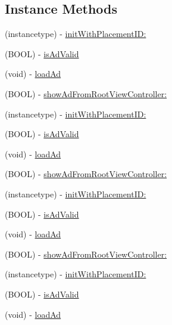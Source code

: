 \subsection*{Instance Methods}
\begin{DoxyCompactItemize}
\item 
(instancetype) -\/ \hyperlink{interfaceFBInterstitialAd_afb4f482b5ab19d486c77785c7794111d}{init\+With\+Placement\+I\+D\+:}
\item 
(B\+O\+OL) -\/ \hyperlink{interfaceFBInterstitialAd_aff851ea8a260430a5b09bce633826876}{is\+Ad\+Valid}
\item 
(void) -\/ \hyperlink{interfaceFBInterstitialAd_a4bbd516a1c5f381ab7af76c2e113fd86}{load\+Ad}
\item 
(B\+O\+OL) -\/ \hyperlink{interfaceFBInterstitialAd_ac9c071a5f699e990e1fa65060fe5c1ce}{show\+Ad\+From\+Root\+View\+Controller\+:}
\item 
(instancetype) -\/ \hyperlink{interfaceFBInterstitialAd_afb4f482b5ab19d486c77785c7794111d}{init\+With\+Placement\+I\+D\+:}
\item 
(B\+O\+OL) -\/ \hyperlink{interfaceFBInterstitialAd_aff851ea8a260430a5b09bce633826876}{is\+Ad\+Valid}
\item 
(void) -\/ \hyperlink{interfaceFBInterstitialAd_a4bbd516a1c5f381ab7af76c2e113fd86}{load\+Ad}
\item 
(B\+O\+OL) -\/ \hyperlink{interfaceFBInterstitialAd_ac9c071a5f699e990e1fa65060fe5c1ce}{show\+Ad\+From\+Root\+View\+Controller\+:}
\item 
(instancetype) -\/ \hyperlink{interfaceFBInterstitialAd_afb4f482b5ab19d486c77785c7794111d}{init\+With\+Placement\+I\+D\+:}
\item 
(B\+O\+OL) -\/ \hyperlink{interfaceFBInterstitialAd_aff851ea8a260430a5b09bce633826876}{is\+Ad\+Valid}
\item 
(void) -\/ \hyperlink{interfaceFBInterstitialAd_a4bbd516a1c5f381ab7af76c2e113fd86}{load\+Ad}
\item 
(B\+O\+OL) -\/ \hyperlink{interfaceFBInterstitialAd_ac9c071a5f699e990e1fa65060fe5c1ce}{show\+Ad\+From\+Root\+View\+Controller\+:}
\item 
(instancetype) -\/ \hyperlink{interfaceFBInterstitialAd_afb4f482b5ab19d486c77785c7794111d}{init\+With\+Placement\+I\+D\+:}
\item 
(B\+O\+OL) -\/ \hyperlink{interfaceFBInterstitialAd_aff851ea8a260430a5b09bce633826876}{is\+Ad\+Valid}
\item 
(void) -\/ \hyperlink{interfaceFBInterstitialAd_a4bbd516a1c5f381ab7af76c2e113fd86}{load\+Ad}

\end{DoxyCompactItemize}
